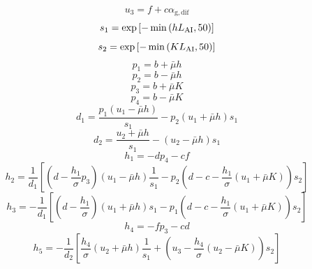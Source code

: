 \begin{equation}
  u_{3}=f+c \alpha_{\mathrm{g, dif}}
\end{equation}
\begin{equation}
  s_{1}=\exp \left[-\min \left(h L_{\rm AI}, 50\right)\right]
\end{equation}
\begin{equation}
  s_{2}=\exp \left[-\min \left(K L_{\rm AI}, 50\right)\right]
\end{equation}
\begin{equation}
  p_{1}=b+\bar{\mu} h
\end{equation}
\begin{equation}
  p_{2}=b-\bar{\mu} h
\end{equation}
\begin{equation}
  p_{3}=b+\bar{\mu} K
\end{equation}
\begin{equation}
  p_{4}=b-\bar{\mu} K
\end{equation}
\begin{equation}
  d_{1}=\frac{p_{1}\left(u_{1}-\bar{\mu} h\right)}{s_{1}}-p_{2}\left(u_{1}+\bar{\mu} h\right) s_{1}
\end{equation}
\begin{equation}
  d_{2}=\frac{u_{2}+\bar{\mu} h}{s_{1}}-\left(u_{2}-\bar{\mu} h\right) s_{1}
\end{equation}
\begin{equation}
  h_{1}=-d p_{4}-c f
\end{equation}
\begin{equation}
  h_{2}=\frac{1}{d_{1}}\left[\left(d-\frac{h_{1}}{\sigma} p_{3}\right)\left(u_{1}-\bar{\mu} h\right)
  \frac{1}{s_{1}}-p_{2}\left(d-c-\frac{h_{1}}{\sigma}\left(u_{1}+\bar{\mu} K\right)\right) s_{2}\right]
\end{equation}
\begin{equation}
  h_{3}=-\frac{1}{d_{1}}\left[\left(d-\frac{h_{1}}{\sigma}\right)\left(u_{1}+\bar{\mu} h\right)
  s_{1}-p_{1}\left(d-c-\frac{h_{1}}{\sigma}\left(u_{1}+\bar{\mu} K\right)\right) s_{2}\right]
\end{equation}
\begin{equation}
  h_{4}=-f p_{3}-c d
\end{equation}
\begin{equation}
  h_{5}=-\frac{1}{d_{2}}\left[\frac{h_{4}}{\sigma}\left(u_{2}+\bar{\mu} h\right)
  \frac{1}{s_{1}}+\left(u_{3}-\frac{h_{4}}{\sigma}\left(u_{2}-\bar{\mu} K\right)\right) s_{2}\right]
\end{equation}
